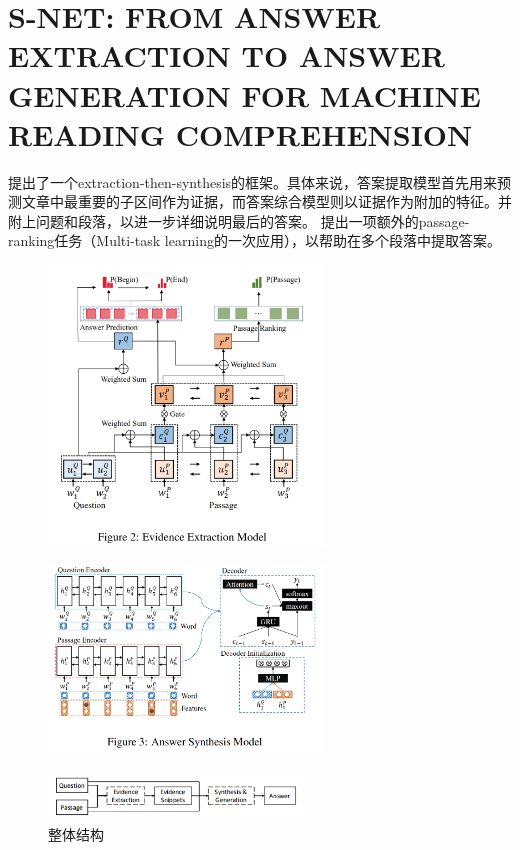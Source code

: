 \documentclass[a4paper,UTF8]{article}
\numberwithin{equation}{section}
\begin{document}
\section{S-NET: FROM ANSWER EXTRACTION TO ANSWER GENERATION FOR MACHINE READING COMPREHENSION}
提出了一个extraction-then-synthesis的框架。具体来说，答案提取模型首先用来预测文章中最重要的子区间作为证据，而答案综合模型则以证据作为附加的特征。并附上问题和段落，以进一步详细说明最后的答案。
提出一项额外的passage-ranking任务（Multi-task learning的一次应用），以帮助在多个段落中提取答案。
\begin{figure}[H]
	\centering
	\includegraphics[width=0.65\textwidth]{4-1.png}
\end{figure}
\begin{figure}[H]
	\centering
	\includegraphics[width=0.65\textwidth]{4-2.png}
\end{figure}
\begin{figure}[H]
	\centering
	\includegraphics[width=0.6\textwidth]{4-3.png}
	\caption{整体结构}
\end{figure}
\end{document}
